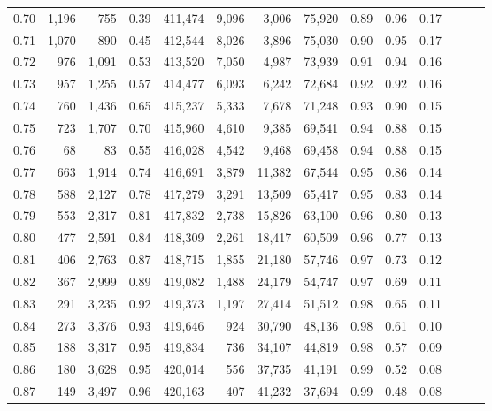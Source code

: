 \begin{tabular}{rrrrrrrrrrrrrr}
0.70 &   1,196 &    755 &  0.39 &  411,474 &    9,096 &   3,006 &  75,920 &  0.89 &  0.96 &      0.17 \\
0.71 &   1,070 &    890 &  0.45 &  412,544 &    8,026 &   3,896 &  75,030 &  0.90 &  0.95 &      0.17 \\
0.72 &     976 &  1,091 &  0.53 &  413,520 &    7,050 &   4,987 &  73,939 &  0.91 &  0.94 &      0.16 \\
0.73 &     957 &  1,255 &  0.57 &  414,477 &    6,093 &   6,242 &  72,684 &  0.92 &  0.92 &      0.16 \\
0.74 &     760 &  1,436 &  0.65 &  415,237 &    5,333 &   7,678 &  71,248 &  0.93 &  0.90 &      0.15 \\
0.75 &     723 &  1,707 &  0.70 &  415,960 &    4,610 &   9,385 &  69,541 &  0.94 &  0.88 &      0.15 \\
0.76 &      68 &     83 &  0.55 &  416,028 &    4,542 &   9,468 &  69,458 &  0.94 &  0.88 &      0.15 \\
0.77 &     663 &  1,914 &  0.74 &  416,691 &    3,879 &  11,382 &  67,544 &  0.95 &  0.86 &      0.14 \\
0.78 &     588 &  2,127 &  0.78 &  417,279 &    3,291 &  13,509 &  65,417 &  0.95 &  0.83 &      0.14 \\
0.79 &     553 &  2,317 &  0.81 &  417,832 &    2,738 &  15,826 &  63,100 &  0.96 &  0.80 &      0.13 \\
0.80 &     477 &  2,591 &  0.84 &  418,309 &    2,261 &  18,417 &  60,509 &  0.96 &  0.77 &      0.13 \\
0.81 &     406 &  2,763 &  0.87 &  418,715 &    1,855 &  21,180 &  57,746 &  0.97 &  0.73 &      0.12 \\
0.82 &     367 &  2,999 &  0.89 &  419,082 &    1,488 &  24,179 &  54,747 &  0.97 &  0.69 &      0.11 \\
0.83 &     291 &  3,235 &  0.92 &  419,373 &    1,197 &  27,414 &  51,512 &  0.98 &  0.65 &      0.11 \\
0.84 &     273 &  3,376 &  0.93 &  419,646 &      924 &  30,790 &  48,136 &  0.98 &  0.61 &      0.10 \\
0.85 &     188 &  3,317 &  0.95 &  419,834 &      736 &  34,107 &  44,819 &  0.98 &  0.57 &      0.09 \\
0.86 &     180 &  3,628 &  0.95 &  420,014 &      556 &  37,735 &  41,191 &  0.99 &  0.52 &      0.08 \\
0.87 &     149 &  3,497 &  0.96 &  420,163 &      407 &  41,232 &  37,694 &  0.99 &  0.48 &      0.08 \\

\end{tabular}

